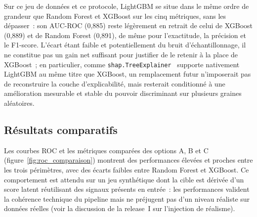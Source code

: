 \documentclass[a4paper,12pt,oneside]{report}
\begin{document}
Sur ce jeu de données et ce protocole, LightGBM se situe dans le même ordre de grandeur que
Random Forest et XGBoost sur les cinq métriques, sans les dépasser~: son AUC-ROC (0{,}885)
reste légèrement en retrait de celui de XGBoost (0{,}889) et de Random Forest (0{,}891), de
même pour l'exactitude, la précision et le F1-score. L'écart étant faible et potentiellement
du bruit d'échantillonnage, il ne constitue pas un gain net suffisant pour justifier de le
retenir à la place de XGBoost~; en particulier, comme \texttt{shap.TreeExplainer}~\cite{shapdoc}
supporte nativement LightGBM au même titre que XGBoost, un remplacement futur n'imposerait pas
de reconstruire la couche d'explicabilité, mais resterait conditionné à une amélioration
mesurable et stable du pouvoir discriminant sur plusieurs graines aléatoires.

\subsection{Résultats comparatifs}

Les courbes ROC et les métriques comparées des options A, B et C
(figure~\ref{fig:roc_comparaison}) montrent des performances élevées et proches entre les
trois périmètres, avec des écarts faibles entre Random Forest et XGBoost. Ce comportement est
attendu sur un jeu synthétique dont la cible est dérivée d'un score latent réutilisant des
signaux présents en entrée~: les performances valident la cohérence technique du pipeline
mais ne préjugent pas d'un niveau réaliste sur données réelles (voir la discussion de la
release~I sur l'injection de réalisme).
\end{document}
